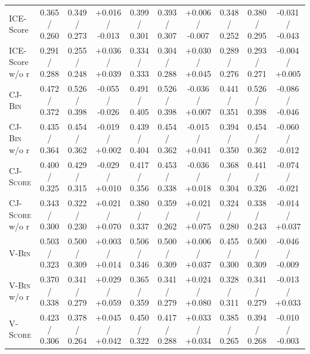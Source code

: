 \begin{table}[t]
\begin{tabular}{@{}
        l|ccc|ccc|ccc@{}}
        \midrule
        \midrule
        ICE-Score               & 0.365 / 0.260   & 0.349 / 0.273   & +0.016 / -0.013                     & 0.399 / 0.301   & 0.393 / 0.307   & +0.006 / -0.007                     & 0.348 / 0.252   & 0.380 / 0.295   & -0.031 / -0.043                     \\
        ICE-Score w/o r         & 0.291 / 0.288   & 0.255 / 0.248   & +0.036 / +0.039                     & 0.334 / 0.333   & 0.304 / 0.288   & +0.030 / +0.045                     & 0.289 / 0.276   & 0.293 / 0.271   & -0.004 / +0.005                     \\
        \midrule
        \textsc{CJ-Bin}         & 0.472 / 0.372   & 0.526 / 0.398   & -0.055 / -0.026                     & 0.491 / 0.405   & 0.526 / 0.398   & -0.036 / +0.007                     & 0.441 / 0.351   & 0.526 / 0.398   & -0.086 / -0.046                     \\
        \textsc{CJ-Bin} w/o r   & 0.435 / 0.364   & 0.454 / 0.362   & -0.019 / +0.002                     & 0.439 / 0.404   & 0.454 / 0.362   & -0.015 / +0.041                     & 0.394 / 0.350   & 0.454 / 0.362   & -0.060 / -0.012                     \\
        \midrule
        \textsc{CJ-Score}       & 0.400 / 0.325   & 0.429 / 0.315   & -0.029 / +0.010                     & 0.417 / 0.356   & 0.453 / 0.338   & -0.036 / +0.018                     & 0.368 / 0.304   & 0.441 / 0.326   & -0.074 / -0.021                     \\
        \textsc{CJ-Score} w/o r & 0.343 / 0.300   & 0.322 / 0.230   & +0.021 / +0.070                     & 0.380 / 0.337   & 0.359 / 0.262   & +0.021 / +0.075                     & 0.324 / 0.280   & 0.338 / 0.243   & -0.014 / +0.037                     \\
        \midrule
        \textsc{V-Bin}          & 0.503 / 0.323   & 0.500 / 0.309   & +0.003 / +0.014                     & 0.506 / 0.346   & 0.500 / 0.309   & +0.006 / +0.037                     & 0.455 / 0.300   & 0.500 / 0.309   & -0.046 / -0.009                     \\
        \textsc{V-Bin} w/o r    & 0.370 / 0.338   & 0.341 / 0.279   & +0.029 / +0.059                     & 0.365 / 0.359   & 0.341 / 0.279   & +0.024 / +0.080                     & 0.328 / 0.311   & 0.341 / 0.279   & -0.013 / +0.033                     \\
        \midrule
        \textsc{V-Score}        & 0.423 / 0.306   & 0.378 / 0.264   & +0.045 / +0.042                     & 0.450 / 0.322   & 0.417 / 0.288   & +0.033 / +0.034                     & 0.385 / 0.265   & 0.394 / 0.268   & -0.010 / -0.003                     \\

\end{tabular}
\end{table}
